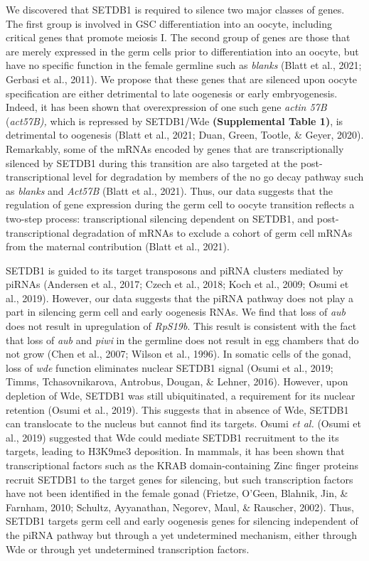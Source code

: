 \documentclass[12pt,oneside]{reedthesis}
\begin{document}
We discovered that SETDB1 is required to silence two major classes of
genes. The first group is involved in GSC differentiation into an
oocyte, including critical genes that promote meiosis I. The second
group of genes are those that are merely expressed in the germ cells
prior to differentiation into an oocyte, but have no specific function
in the female germline such as \emph{blanks}
(Blatt et al., 2021; Gerbasi et al., 2011).
We propose that these genes that are silenced upon oocyte specification
are either detrimental to late oogenesis or early embryogenesis. Indeed,
it has been shown that overexpression of one such gene \emph{actin 57B}
(\emph{act57B),} which is repressed by SETDB1/Wde \textbf{(Supplemental Table 1)},
is detrimental to oogenesis (Blatt et al., 2021; Duan, Green, Tootle, \& Geyer, 2020). Remarkably, some of the mRNAs
encoded by genes that are transcriptionally silenced by SETDB1 during
this transition are also targeted at the post-transcriptional level for
degradation by members of the no go decay pathway such as \emph{blanks} and
\emph{Act57B} (Blatt et al., 2021). Thus, our data suggests
that the regulation of gene expression during the germ cell to oocyte
transition reflects a two-step process: transcriptional silencing
dependent on SETDB1, and post-transcriptional degradation of mRNAs to
exclude a cohort of germ cell mRNAs from the maternal contribution
(Blatt et al., 2021).

SETDB1 is guided to its target transposons and piRNA clusters mediated
by piRNAs
(Andersen et al., 2017; Czech et al., 2018; Koch et al., 2009; Osumi et al., 2019). However, our data suggests that the
piRNA pathway does not play a part in silencing germ cell and early
oogenesis RNAs. We find that loss of \emph{aub} does not result in
upregulation of \emph{RpS19b}. This result is consistent with the fact that
loss of \emph{aub} and \emph{piwi} in the germline does not result in egg chambers
that do not grow (Chen et al., 2007; Wilson et al., 1996). In somatic cells of the gonad,
loss of \emph{wde} function eliminates nuclear SETDB1 signal
(Osumi et al., 2019; Timms, Tchasovnikarova, Antrobus, Dougan, \& Lehner, 2016). However, upon depletion
of Wde, SETDB1 was still ubiquitinated, a requirement for its nuclear
retention (Osumi et al., 2019). This suggests that in
absence of Wde, SETDB1 can translocate to the nucleus but cannot find
its targets. Osumi \emph{et al.} (Osumi et al., 2019)
suggested that Wde could mediate SETDB1 recruitment to the its targets,
leading to H3K9me3 deposition. In mammals, it has been shown that
transcriptional factors such as the KRAB domain-containing Zinc finger
proteins recruit SETDB1 to the target genes for silencing, but such
transcription factors have not been identified in the female gonad
(Frietze, O'Geen, Blahnik, Jin, \& Farnham, 2010; Schultz, Ayyanathan, Negorev, Maul, \& Rauscher, 2002). Thus, SETDB1 targets germ cell
and early oogenesis genes for silencing independent of the piRNA pathway
but through a yet undetermined mechanism, either through Wde or through
yet undetermined transcription factors.
\end{document}
